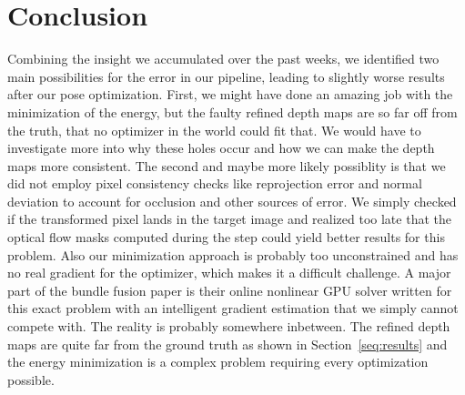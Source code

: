 \chapter{Conclusion}
    Combining the insight we accumulated over the past weeks, we identified two main possibilities for the error in our pipeline, leading to slightly worse results after our pose optimization.
    First, we might have done an amazing job with the minimization of the energy, but the faulty refined depth maps are so far off from the truth, that no optimizer in the world could fit that.
    We would have to investigate more into why these holes occur and how we can make the depth maps more consistent.
    The second and maybe more likely possiblity is that we did not employ pixel consistency checks like reprojection error and normal deviation to account for occlusion and other sources of error.
    We simply checked if the transformed pixel lands in the target image and realized too late that the optical flow masks computed during the  step could yield better results for this problem.
    Also our minimization approach is probably too unconstrained and has no real gradient for the optimizer, which makes it a difficult challenge.
    A major part of the bundle fusion paper is their online nonlinear GPU solver written for this exact problem with an intelligent gradient estimation that we simply cannot compete with.
    The reality is probably somewhere inbetween. 
    The refined depth maps are quite far from the ground truth as shown in Section~\ref{seq:results} and the energy minimization is a complex problem requiring every optimization possible.

